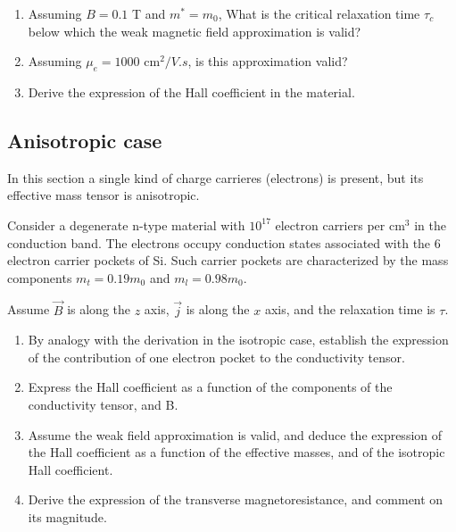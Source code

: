 \begin{enumerate}[label=(\roman*)]
\item Assuming $B=0.1$ T and $m^* = m_0$, What is the critical relaxation
  time $\tau_c$ below which the weak magnetic field approximation is valid?
\item Assuming $\mu_e = 1000 \text{ cm}^2/V.s$, is this approximation valid?
\item Derive the expression of the Hall coefficient in the material.
\end{enumerate}

\subsection*{Anisotropic case}

In this section a single kind of charge carrieres (electrons) is
present, but its effective mass tensor is
anisotropic.

Consider a degenerate
n-type material with $10^{17}$ electron carriers per cm$^3$ in the
conduction band. The electrons occupy conduction states associated
with the 6 electron carrier pockets of
Si. Such carrier pockets are characterized by the mass components
$m_t = 0.19 m_0$ and $m_l = 0.98 m_0$.

Assume $\vec{B}$ is along the $z$ axis, $\vec{j}$ is along the $x$
axis, and the relaxation time is $\tau$.

\begin{enumerate}[label=(\roman*)]
\item By analogy with the derivation in the isotropic case, establish the
  expression of the contribution of one electron pocket to the
  conductivity tensor.
\item Express the Hall coefficient as a function of the components of
  the conductivity tensor, and B.
\item Assume the weak field approximation is valid, and deduce the
  expression of the Hall coefficient as a function of the effective
  masses, and of the isotropic Hall coefficient.
\item Derive the expression of the transverse magnetoresistance, and
  comment on its magnitude.
\end{enumerate}


